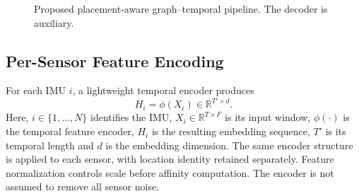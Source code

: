 \documentclass[12pt,a4paper,twoside,openright]{report}
\begin{document}
\begin{figure}[hbt!]
\centering
{}
\caption{Proposed placement-aware graph--temporal pipeline. The decoder is auxiliary.}
\label{fig:proposed-architecture}
\end{figure}

\subsection{Per-Sensor Feature Encoding}
For each IMU $i$, a lightweight temporal encoder produces
\[
H_i=\phi(X_i)\in\mathbb{R}^{T'\times d}.
\]
Here, $i\in\{1,\ldots,N\}$ identifies the IMU, $X_i\in\mathbb{R}^{T\times F}$ is its input window, $\phi(\cdot)$ is the temporal feature encoder, $H_i$ is the resulting embedding sequence, $T'$ is its temporal length and $d$ is the embedding dimension. The same encoder structure is applied to each sensor, with location identity retained separately. Feature normalization controls scale before affinity computation. The encoder is not assumed to remove all sensor noise.
\end{document}

